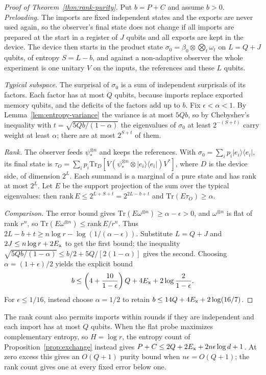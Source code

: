 \documentclass[11pt,a4paper]{article}
\theoremstyle{plain}
\theoremstyle{definition}
\theoremstyle{remark}
\begin{document}
\begin{proof}[Proof of Theorem~\ref{thm:rank-purity}]
Put $b=P+C$ and assume $b>0$. \emph{Preloading.} The imports are fixed independent states and the exports are never used again, so the
observer's final state does not change if all imports are prepared at the start in a register of $J$ qubits and all exports are kept in the
device. The device then starts in the product state $\sigma_0=\beta_0\otimes\bigotimes_t\omega_t$ on $L=Q+J$ qubits, of entropy $S=L-b$, and against a
non-adaptive observer the whole experiment is one unitary $V$ on the inputs, the references and these $L$ qubits.

\emph{Typical subspace.} The surprisal of $\sigma_0$ is a sum of independent surprisals of its factors. Each factor has at most $Q$ qubits, because
imports replace exported memory qubits, and the deficits of the factors add up to $b$. Fix $\epsilon<\alpha<1$.
By Lemma~\ref{lem:entropy-variance} the variance is at most
$5Qb$, so by Chebyshev's inequality with $t=\sqrt{5Qb/(1-\alpha)}$ the eigenvalues of $\sigma_0$ at least $2^{-(S+t)}$ carry weight at least $\alpha$; there are at most
$2^{S+t}$ of them.

\emph{Rank.} The observer feeds $\psi_*^{\otimes n}$ and keeps the references. With $\sigma_0=\sum_ip_i|e_i\rangle\langle e_i|$, its final state is
$\tau_O=\sum_ip_i\mathrm{Tr}_D[V(\psi_*^{\otimes n}\otimes|e_i\rangle\langle e_i|)V^*]$, where $D$ is the device side, of dimension $2^L$. Each summand is a
marginal of a pure state and has rank at most $2^L$. Let $E$ be the support projection of the sum over the typical eigenvalues: then
$\mathrm{rank}\,E\le2^{L+S+t}=2^{2L-b+t}$ and $\mathrm{Tr}(E\tau_O)\ge\alpha$.

\emph{Comparison.} The error bound gives $\mathrm{Tr}(E\omega^{\otimes n})\ge\alpha-\epsilon>0$, and $\omega^{\otimes n}$ is flat of rank $r^n$, so
$\mathrm{Tr}(E\omega^{\otimes n})\le\mathrm{rank}\,E/r^n$. Thus $2L-b+t\ge n\log r-\log(1/(\alpha-\epsilon))$.
Substitute $L=Q+J$ and $2J\le n\log r+2E_{\rm x}$ to get the first bound; the inequality
$\sqrt{5Qb/(1-\alpha)}\le b/2+5Q/[2(1-\alpha)]$ gives the second.
Choosing $\alpha=(1+\epsilon)/2$ yields the explicit bound
\[
b\le\left(4+\frac{10}{1-\epsilon}\right)Q+4E_{\rm x}+2\log\frac2{1-\epsilon}.
\]
For $\epsilon\le1/16$, instead choose $\alpha=1/2$ to retain $b\le14Q+4E_{\rm x}+2\log(16/7)$.
\end{proof}

The rank count also permits imports within rounds if they are independent and each import has at most $Q$ qubits.
When the flat probe maximizes complementary entropy, so $H=\log r$, the entropy count of Proposition~\ref{prop:exchange} instead gives
$P+C\le2Q+2E_{\rm x}+2n\epsilon\log d+1$.
At zero excess this gives an $O(Q+1)$ purity bound when $n\epsilon=O(Q+1)$; the rank count gives one at every fixed error below one.
\end{document}
